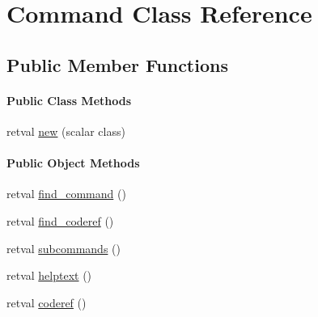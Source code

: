 \hypertarget{classxmpproxy_1_1_command}{
\section{\-Command \-Class \-Reference}
\label{classxmpproxy_1_1_command}
}
\subsection*{\-Public \-Member \-Functions}
\begin{Indent}\paragraph*{\-Public \-Class \-Methods}
\begin{DoxyCompactItemize}
\item 
retval \hyperlink{classxmpproxy_1_1_command_a04de1185dad12c1c24cac9235c2bbeff}{new} (scalar class)
\end{DoxyCompactItemize}
\end{Indent}
\begin{Indent}\paragraph*{\-Public \-Object \-Methods}
\begin{DoxyCompactItemize}
\item 
retval \hyperlink{classxmpproxy_1_1_command_a33f721569b8f0afa3d9261921ee784cf}{find\-\_\-command} ()
\item 
retval \hyperlink{classxmpproxy_1_1_command_a604c5eef2d9bfbb98189d7577058e2dc}{find\-\_\-coderef} ()
\item 
retval \hyperlink{classxmpproxy_1_1_command_aa97406ef0dd8fbef2baf9eba5adc3072}{subcommands} ()
\item 
retval \hyperlink{classxmpproxy_1_1_command_a14f671033171a171c324dbab1e4ac8a8}{helptext} ()
\item 
retval \hyperlink{classxmpproxy_1_1_command_a9a877fbf2d48dcd278853250825ae9a2}{coderef} ()
\end{DoxyCompactItemize}
\end{Indent}


